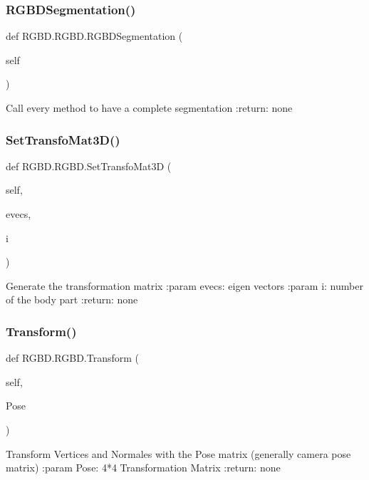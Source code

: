 \subsubsection{R\+G\+B\+D\+Segmentation()}
{\footnotesize\ttfamily def R\+G\+B\+D.\+R\+G\+B\+D.\+R\+G\+B\+D\+Segmentation (\begin{DoxyParamCaption}\item[{}]{self }\end{DoxyParamCaption})}

\begin{DoxyVerb}Call every method to have a complete segmentation
:return: none
\end{DoxyVerb}
 \mbox{\label{class_r_g_b_d_1_1_r_g_b_d_aeac30c5f185a4e6637a63c882bd06d9e}} 
\subsubsection{Set\+Transfo\+Mat3\+D()}
{\footnotesize\ttfamily def R\+G\+B\+D.\+R\+G\+B\+D.\+Set\+Transfo\+Mat3D (\begin{DoxyParamCaption}\item[{}]{self,  }\item[{}]{evecs,  }\item[{}]{i }\end{DoxyParamCaption})}

\begin{DoxyVerb}Generate the transformation matrix
:param evecs: eigen vectors
:param i: number of the body part
:return: none
\end{DoxyVerb}
 \mbox{\label{class_r_g_b_d_1_1_r_g_b_d_a0ca12b764dab40af78e8a83a5b9f3011}} 
\subsubsection{Transform()}
{\footnotesize\ttfamily def R\+G\+B\+D.\+R\+G\+B\+D.\+Transform (\begin{DoxyParamCaption}\item[{}]{self,  }\item[{}]{Pose }\end{DoxyParamCaption})}

\begin{DoxyVerb}Transform Vertices and Normales with the Pose matrix (generally camera pose matrix)
:param Pose: 4*4 Transformation Matrix
:return: none
\end{DoxyVerb}
 \mbox{\label{class_r_g_b_d_1_1_r_g_b_d_a98624ce143f3ea4b766e337467faaf68}} 
